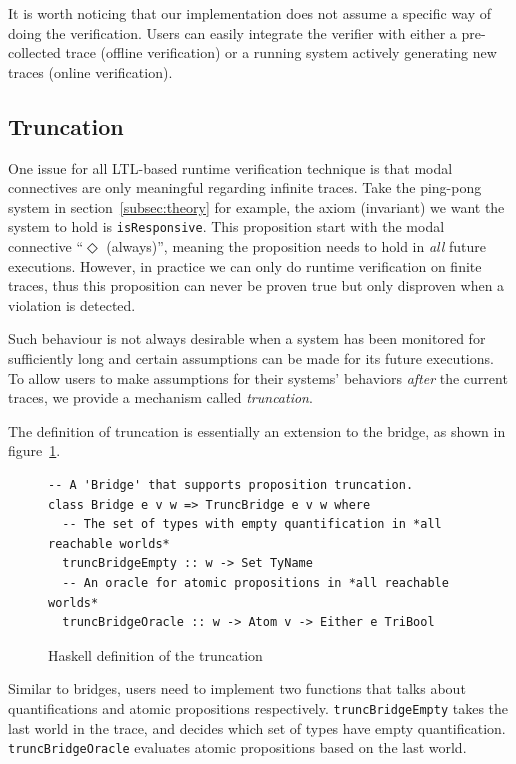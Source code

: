 \documentclass[format=acmsmall, nonacm=true, review=true, screen=true]{acmart}
\newcommand{\mycaption}[1]{\Description{#1}\caption{#1}}
\begin{document}
It is worth noticing that our implementation does not assume a specific way of doing the verification.
Users can easily integrate the verifier with either a pre-collected trace (offline verification) or a running system actively generating new traces (online verification).

\subsection{Truncation}

One issue for all LTL-based runtime verification technique is that modal connectives are only meaningful regarding infinite traces.
Take the ping-pong system in section~\ref{subsec:theory} for example, the axiom (invariant) we want the system to hold is \texttt{isResponsive}.
This proposition start with the modal connective ``$\Diamond$ (always)'', meaning the proposition needs to hold in \textit{all} future executions.
However, in practice we can only do runtime verification on finite traces, thus this proposition can never be proven true but only disproven when a violation is detected.

Such behaviour is not always desirable when a system has been monitored for sufficiently long and certain assumptions can be made for its future executions.
To allow users to make assumptions for their systems' behaviors \textit{after} the current traces, we provide a mechanism called \textit{truncation}.

The definition of truncation is essentially an extension to the bridge, as shown in figure~\ref{fig:truncation-sig}.

\begin{figure}[h]
  {
    \fontsize{10}{12}\selectfont
    \begin{verbatim}
-- A 'Bridge' that supports proposition truncation.
class Bridge e v w => TruncBridge e v w where
  -- The set of types with empty quantification in *all reachable worlds*
  truncBridgeEmpty :: w -> Set TyName
  -- An oracle for atomic propositions in *all reachable worlds*
  truncBridgeOracle :: w -> Atom v -> Either e TriBool
\end{verbatim}
  }
  \mycaption{Haskell definition of the truncation}
  \label{fig:truncation-sig}
\end{figure}

Similar to bridges, users need to implement two functions that talks about quantifications and atomic propositions respectively.
\texttt{truncBridgeEmpty} takes the last world in the trace, and decides which set of types have empty quantification.
\texttt{truncBridgeOracle} evaluates atomic propositions based on the last world.
\end{document}
